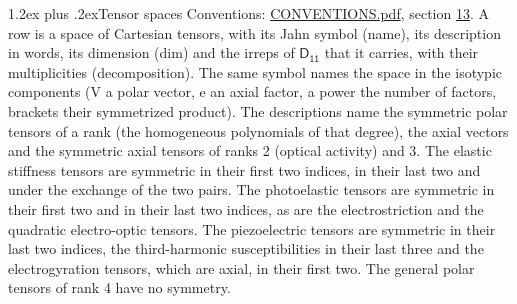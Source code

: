 \documentclass[10pt,a4paper]{article}
\makeatletter
\renewcommand\section{\@startsection{section}{1}{\z@}{-3ex plus -1ex minus -.2ex}%
  {1.2ex plus .2ex}{\normalfont\large\sffamily\bfseries\color{parttitle}}}
\numberwithin{equation}{section}
\newcommand{\grp}[1]{\mathsf{#1}}
\makeatother
\begin{document}
\section{Tensor spaces}\label{s:tensor_spaces}
Conventions: \href{../../CONVENTIONS.pdf}{CONVENTIONS.pdf}, section \href{../../CONVENTIONS.pdf\#conv.13}{13}.
\leavevmode\label{n:head.name}\label{n:head.description}\label{n:head.dim}\label{n:head.decomposition}A row is a space of Cartesian tensors, with its Jahn symbol (name), its description in words, its dimension (dim) and the irreps of $\grp{D_{11}}$ that it carries, with their multiplicities (decomposition). \label{n:label.jahn}The same symbol names the space in the isotypic components (V a polar vector, e an axial factor, a power the number of factors, brackets their symmetrized product). The descriptions name the symmetric polar tensors of a rank (the homogeneous polynomials of that degree), the axial vectors and the symmetric axial tensors of ranks 2 (optical activity) and 3. The elastic stiffness tensors are symmetric in their first two indices, in their last two and under the exchange of the two pairs. The photoelastic tensors are symmetric in their first two and in their last two indices, as are the electrostriction and the quadratic electro-optic tensors. The piezoelectric tensors are symmetric in their last two indices, the third-harmonic susceptibilities in their last three and the electrogyration tensors, which are axial, in their first two. The general polar tensors of rank 4 have no symmetry.
\end{document}
